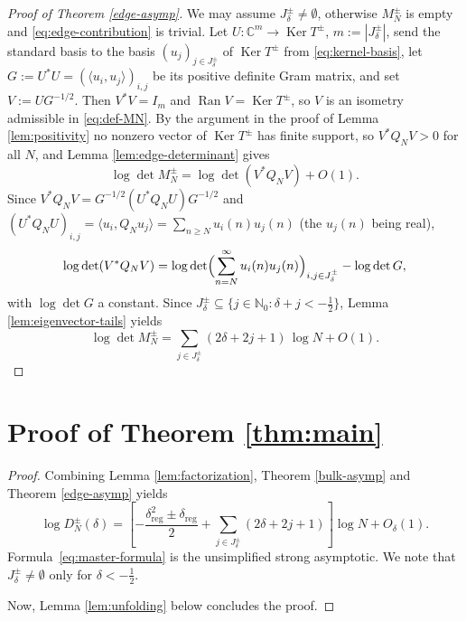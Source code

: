 \documentclass[11pt,a4paper,reqno]{amsart}
\theoremstyle{remark}
\newcommand{\Nzero}{\mathbb N_0}
\newcommand{\C}{\mathbb C}
\newcommand{\Ker}{\operatorname{Ker}}
\newcommand{\Ran}{\operatorname{Ran}}
\newcommand{\id}{I}
\begin{document}
\begin{proof}[Proof of Theorem \ref{edge-asymp}]
We may assume $J^\pm_\delta\ne\emptyset$, otherwise $M_N^\pm$ is empty and \eqref{eq:edge-contribution} is trivial. Let $U:\C^m\to\Ker T^\pm$, $m:=|J^\pm_\delta|$, send the standard basis to the basis $(u_j)_{j\in J^\pm_\delta}$ of $\Ker T^\pm$ from \eqref{eq:kernel-basis}, let $G:=U^*U=(\langle u_i,u_j\rangle)_{i,j}$ be its positive definite Gram matrix, and set $V:=UG^{-1/2}$. Then $V^*V=\id_m$ and $\Ran V=\Ker T^\pm$, so $V$ is an isometry admissible in \eqref{eq:def-MN}. By the argument in the proof of Lemma \ref{lem:positivity} no nonzero vector of $\Ker T^\pm$ has finite support, so $V^*Q_NV>0$ for all $N$, and Lemma \ref{lem:edge-determinant} gives
\begin{equation}
    \log\det M_N^\pm =\log\det(V^*Q_NV)+O(1).
\end{equation}
Since $V^*Q_NV=G^{-1/2}(U^*Q_NU)G^{-1/2}$ and $(U^*Q_NU)_{i,j}=\langle u_i,Q_Nu_j\rangle=\sum_{n\ge N}u_i(n)u_j(n)$ (the $u_j(n)$ being real),
\begin{equation}
    \log\det(V^*Q_NV)
    =\log\det\Bigl(\sum_{n=N}^\infty u_i(n)u_j(n)\Bigr)_{i,j\in J^\pm_\delta}-\log\det G ,
\end{equation}
with $\log\det G$ a constant. Since $J^\pm_\delta\subseteq\{j\in\Nzero:\delta+j<-\tfrac12\}$, Lemma \ref{lem:eigenvector-tails} yields
\begin{equation}
 \log\det M_N^\pm
 =
 \sum_{j\in J^\pm_\delta}(2\delta+2j+1)
 \,\log N+O(1).
\end{equation}
\end{proof}

\section{Proof of Theorem \ref{thm:main}}

\begin{proof}
Combining Lemma \ref{lem:factorization}, Theorem \ref{bulk-asymp} and Theorem \ref{edge-asymp}
 yields
\begin{equation}\label{eq:master-formula}
 \log D_N^\pm(\delta)
 =\left[
 -\frac{\delta_{\text{reg}}^2\pm \delta_{\text{reg}}}{2}
 +\sum_{j\in J^\pm_\delta}(2\delta+2j+1)
 \right]\log N+O_\delta(1).
\end{equation}
Formula~\eqref{eq:master-formula} is the unsimplified strong asymptotic.
We note that $J^\pm_\delta \neq \emptyset$ only for $\delta< -\frac 12$.

Now, Lemma \ref{lem:unfolding} below concludes the proof.
\end{proof}
\end{document}
